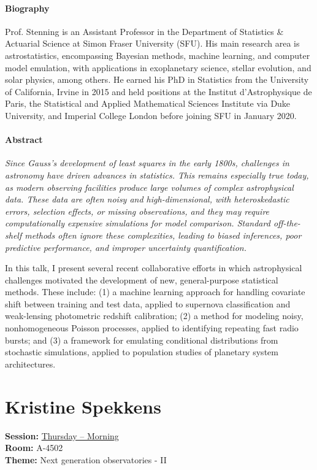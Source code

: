 \paragraph{Biography}
{\sffamily
Prof. Stenning is an Assistant Professor in the Department of Statistics \& Actuarial Science at Simon Fraser University (SFU). His main research area is astrostatistics, encompassing Bayesian methods, machine learning, and computer model emulation, with applications in exoplanetary science, stellar evolution, and solar physics, among others. He earned his PhD in Statistics from the University of California, Irvine in 2015 and held positions at the Institut d'Astrophysique de Paris, the Statistical and Applied Mathematical Sciences Institute via Duke University, and Imperial College London before joining SFU in January 2020.
}

\paragraph{Abstract}
{\itshape
Since Gauss's development of least squares in the early 1800s, challenges in astronomy have driven advances in statistics. This remains especially true today, as modern observing facilities produce large volumes of complex astrophysical data. These data are often noisy and high-dimensional, with heteroskedastic errors, selection effects, or missing observations, and they may require computationally expensive simulations for model comparison. Standard off-the-shelf methods often ignore these complexities, leading to biased inferences, poor predictive performance, and improper uncertainty quantification.

In this talk, I present several recent collaborative efforts in which astrophysical challenges motivated the development of new, general-purpose statistical methods. These include: (1) a machine learning approach for handling covariate shift between training and test data, applied to supernova classification and weak-lensing photometric redshift calibration; (2) a method for modeling noisy, nonhomogeneous Poisson processes, applied to identifying repeating fast radio bursts; and (3) a framework for emulating conditional distributions from stochastic simulations, applied to population studies of planetary system architectures.
}

\hypertarget{invited-kristine-spekkens}{}
\label{invited-page-kristine-spekkens}
\section{Kristine Spekkens}
\textbf{Session:} \hyperlink{schedule-thursday-morning-a-4502}{Thursday -- Morning}\\
\textbf{Room:} A-4502\\
\textbf{Theme:} Next generation observatories - II\\

